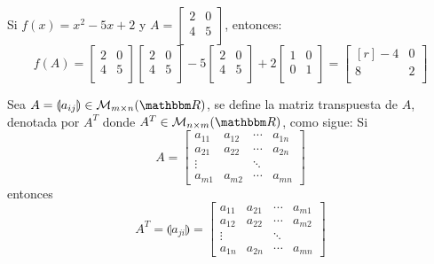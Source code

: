 \begin{example}
    Si $f(x) = x^2 -5x +2$ y $A = \begin{bmatrix}
        2 & 0 \\
        4 & 5 \\
    \end{bmatrix}$, entonces:
    $$f(A) = \begin{bmatrix}
        2 & 0 \\
        4 & 5 \\
    \end{bmatrix} \begin{bmatrix}
        2 & 0 \\
        4 & 5 \\
    \end{bmatrix} -5 \begin{bmatrix}
        2 & 0 \\
        4 & 5 \\
    \end{bmatrix} +2 \begin{bmatrix}
        1 & 0 \\
        0 & 1 \\
    \end{bmatrix} = \begin{bmatrix*}[r]
        -4 & 0 \\
        8 & 2 \\
    \end{bmatrix*}$$
\end{example}

\begin{definition}
    Sea $A = \llparenthesis a_{ij} \rrparenthesis \in \mathcal{M}_{m \times n}(\RR)$, se define la matriz transpuesta de $A$, denotada por $A^T$ donde $A^T \in \mathcal{M}_{n \times m}(\RR)$, como sigue: Si
    $$A = \begin{bmatrix}
        a_{11} & a_{12} & \cdots & a_{1n}\\
        a_{21} & a_{22} & \cdots & a_{2n}\\
        \vdots &  & \ddots & \\
        a_{m1} & a_{m2} & \cdots & a_{mn}
    \end{bmatrix}$$
    entonces
    $$A^T = \llparenthesis a_{ji} \rrparenthesis = \begin{bmatrix}
        a_{11} & a_{21} & \cdots & a_{m1}\\
        a_{12} & a_{22} & \cdots & a_{m2}\\
        \vdots &  & \ddots & \\
        a_{1n} & a_{2n} & \cdots & a_{mn}
    \end{bmatrix}$$
\end{definition}

